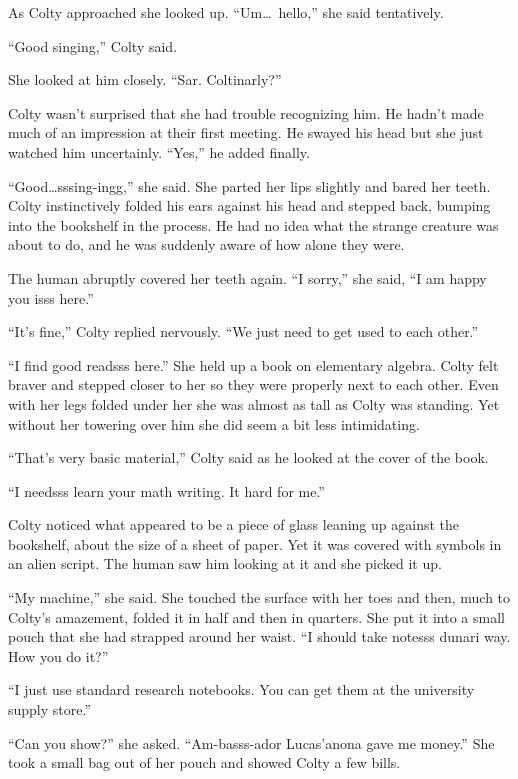 As Colty approached she looked up. ``Um\ldots\ hello,'' she said tentatively.

``Good singing,'' Colty said.

She looked at him closely. ``Sar. Coltinarly?''

Colty wasn't surprised that she had trouble recognizing him. He hadn't made much of an
impression at their first meeting. He swayed his head but she just watched him uncertainly.
``Yes,'' he added finally.

``Good\ldots sssing-ingg,'' she said. She parted her lips slightly and bared her teeth. Colty
instinctively folded his ears against his head and stepped back, bumping into the bookshelf in
the process. He had no idea what the strange creature was about to do, and he was suddenly aware
of how alone they were.

The human abruptly covered her teeth again. ``I sorry,'' she said, ``I am happy you isss here.''

``It's fine,'' Colty replied nervously. ``We just need to get used to each other.''

``I find good readsss here.'' She held up a book on elementary algebra. Colty felt braver and
stepped closer to her so they were properly next to each other. Even with her legs folded under
her she was almost as tall as Colty was standing. Yet without her towering over him she did seem
a bit less intimidating.

``That's very basic material,'' Colty said as he looked at the cover of the book.

``I needsss learn your math writing. It hard for me.''

Colty noticed what appeared to be a piece of glass leaning up against the bookshelf, about the
size of a sheet of paper. Yet it was covered with symbols in an alien script. The human saw him
looking at it and she picked it up.

``My machine,'' she said. She touched the surface with her toes and then, much to Colty's
amazement, folded it in half and then in quarters. She put it into a small pouch that she had
strapped around her waist. ``I should take notesss dunari way. How you do it?''

``I just use standard research notebooks. You can get them at the university supply store.''

``Can you show?'' she asked. ``Am-basss-ador Lucas'anona gave me money.'' She took a small bag
out of her pouch and showed Colty a few bills.

